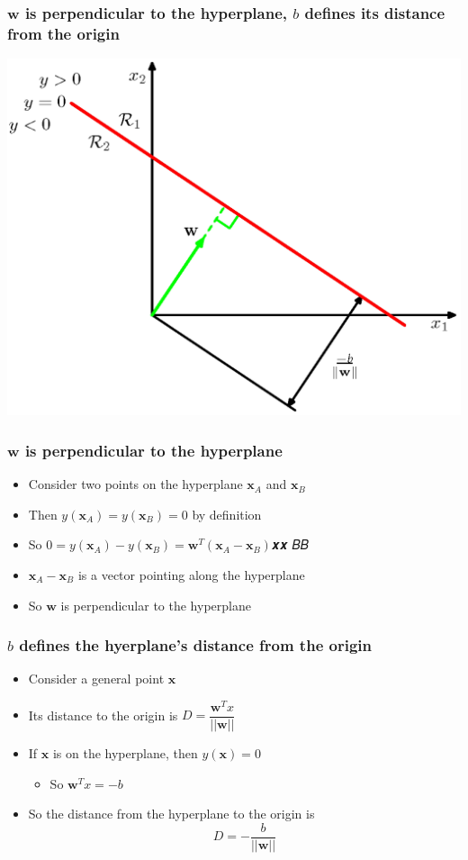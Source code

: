 \documentclass[12pt,notes,mathserif]{beamer}
\begin{document}
\begin{frame}[c]
\frametitle{$\bm{w}$ is perpendicular to the hyperplane, $b$ defines its distance from the origin}
\begin{center}
\includegraphics[width=0.7\linewidth]{fig8/lec812.jpg}
\end{center}
\end{frame}


\begin{frame}[c]
\frametitle{$\bm{w}$ is perpendicular to the hyperplane}
\begin{itemize}
\item Consider two points on the hyperplane $\bm{x}_A$ and $\bm{x}_B$
\item Then $y(\bm{x}_A)=y(\bm{x}_B)=0$ by definition
\item So $0 =y(\bm{x}_A)− y(\bm{x}_B) = \bm{w}^T(\bm{x}_A-\bm{x}_B)$𝒙𝒙 𝐵𝐵 
\item $\bm{x}_A-\bm{x}_B$ is  a vector pointing along the hyperplane
\item So $\bm{w}$ is perpendicular to the hyperplane
\end{itemize}

\end{frame}





\begin{frame}[c]
\frametitle{$b$ defines the hyerplane's distance from the origin}
\begin{itemize}
\item Consider a general point $\bm{x}$
\item Its distance to the origin is $D=\dfrac{\bm{w}^Tx}{||\bm{w}||}$
\item If $\bm{x}$ is on the hyperplane, then $y(\bm{x})=0$
		\begin{itemize}
		\item So $\bm{w}^T x=-b$
		\end{itemize}
\item So the distance from the hyperplane to the origin is
\[
D=-\dfrac{b}{||\bm{w}||}
\]
\end{itemize}

\end{frame}
\end{document}

